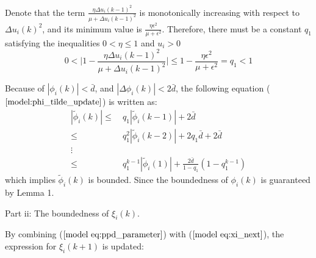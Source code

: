 \documentclass[journal,onecolumn]{IEEEtran}
\begin{document}
Denote that the term $ \frac{\eta \Delta u_i(k-1)^2}{\mu + \Delta u_i(k-1)^2} $ is monotonically increasing with respect to $ \Delta u_i(k)^2 $, and its minimum value is $ \frac{\eta \epsilon^2}{\mu + \epsilon^2} $. Therefore, there must be a constant $ q_1 $ satisfying the inequalities $ 0 < \eta \leq 1 $ and $ u_i > 0$
\begin{equation}
    \label{model eq:ineq}
    0 < \bigg |1 - \frac{\eta \Delta u_i(k-1)^2}{\mu + \Delta u_i(k-1)^2} \bigg| \leq 1 - \frac{\eta \epsilon^2}{\mu + \epsilon^2} = q_1 < 1 
\end{equation}

Because of $ |\phi_i(k)| < \bar{d} $, and $ |\Delta \phi_i(k)| < 2 \bar{d} $, the following equation ($ \ref{model:phi_tilde_update} $) is written as:
\begin{align}
    \label{model:absolute}
    |\tilde{\phi}_i(k)| \leq \ & q_1|\tilde{\phi}_i(k-1)| + 2 \bar{d} \quad \nonumber \\
    \leq \ & q_1^2|\tilde{\phi}_i(k-2)| + 2 q_1\bar{d} + 2\bar{d} \quad \nonumber \\
    \vdots \nonumber \\
    \leq \ & q_1^{k-1}|\tilde{\phi}_i(1)| + \frac{2 \bar{d}}{1-q_1}(1-q_1^{k-1})
\end{align} 
which implies $ \tilde{\phi}_i(k) $ is bounded. Since the boundedness of $ \phi_i(k) $ is guaranteed by Lemma 1. 
    
Part ii: The boundedness of $ \xi_i(k)$.

By combining ($ \ref{model eq:ppd_parameter} $) with ($ \ref{model eq:xi_next} $), the expression for \(\xi_i(k+1)\) is updated:
\end{document}
